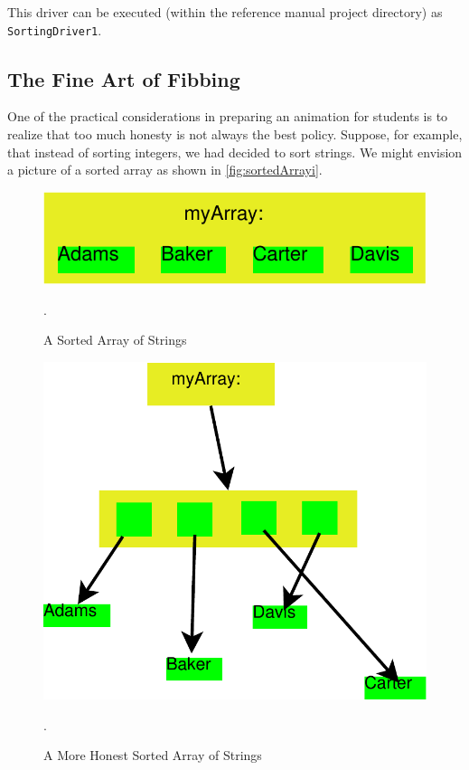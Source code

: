 \documentclass[11pt,titlepage]{book}
\begin{document}
This driver can be executed (within the reference manual project
directory) as \texttt{SortingDriver1}.

\subsection{The Fine Art of Fibbing}

One of the practical considerations in preparing an animation for
students is to realize that too much honesty is not always the best
policy.  Suppose, for example, that instead of sorting integers, we
had decided to sort strings. We might envision a picture of a sorted
array as shown in \autoref{fig:sortedArrayi}.
\begin{figure}
  \begin{center}
    \includegraphics[scale=0.5]{images/array1}
  \end{center}
  \caption{A Sorted Array of Strings}\label{fig:sortedArrayi}.
\end{figure}
\begin{figure}
  \begin{center}
    \includegraphics[scale=0.5]{images/array2}
  \end{center}
  \caption{A More Honest Sorted Array of Strings}\label{fig:sortedArrayii}.
\end{figure}
\end{document}
